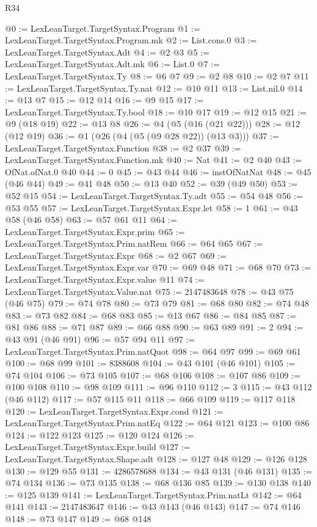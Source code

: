 \begin{lexlean}{R34}
\begin{coremodule}
@0 := LexLeanTarget.TargetSyntax.Program
@1 := LexLeanTarget.TargetSyntax.Program.mk
@2 := List.cons.{0}
@3 := LexLeanTarget.TargetSyntax.Adt
@4 := @2 @3
@5 := LexLeanTarget.TargetSyntax.Adt.mk
@6 := List.{0}
@7 := LexLeanTarget.TargetSyntax.Ty
@8 := @6 @7
@9 := @2 @8
@10 := @2 @7
@11 := LexLeanTarget.TargetSyntax.Ty.nat
@12 := @10 @11
@13 := List.nil.{0}
@14 := @13 @7
@15 := @12 @14
@16 := @9 @15
@17 := LexLeanTarget.TargetSyntax.Ty.bool
@18 := @10 @17
@19 := @12 @15
@21 := @9 (@18 @19)
@22 := @13 @8
@26 := @4 (@5 (@16 (@21 @22)))
@28 := @12 (@12 @19)
@36 := @1 (@26 (@4 (@5 (@9 @28 @22)) (@13 @3)))
@37 := LexLeanTarget.TargetSyntax.Function
@38 := @2 @37
@39 := LexLeanTarget.TargetSyntax.Function.mk
@40 := Nat
@41 := @2 @40
@43 := OfNat.ofNat.{0} @40
@44 := 0
@45 := @43 @44
@46 := instOfNatNat
@48 := @45 (@46 @44)
@49 := @41 @48
@50 := @13 @40
@52 := @39 (@49 @50)
@53 := @52 @15
@54 := LexLeanTarget.TargetSyntax.Ty.adt
@55 := @54 @48
@56 := @53 @55
@57 := LexLeanTarget.TargetSyntax.Expr.let
@58 := 1
@61 := @43 @58 (@46 @58)
@63 := @57 @61 @11
@64 := LexLeanTarget.TargetSyntax.Expr.prim
@65 := LexLeanTarget.TargetSyntax.Prim.natRem
@66 := @64 @65
@67 := LexLeanTarget.TargetSyntax.Expr
@68 := @2 @67
@69 := LexLeanTarget.TargetSyntax.Expr.var
@70 := @69 @48
@71 := @68 @70
@73 := LexLeanTarget.TargetSyntax.Expr.value @11
@74 := LexLeanTarget.TargetSyntax.Value.nat
@75 := 2147483648
@78 := @43 @75 (@46 @75)
@79 := @74 @78
@80 := @73 @79
@81 := @68 @80
@82 := @74 @48
@83 := @73 @82
@84 := @68 @83
@85 := @13 @67
@86 := @84 @85
@87 := @81 @86
@88 := @71 @87
@89 := @66 @88
@90 := @63 @89
@91 := 2
@94 := @43 @91 (@46 @91)
@96 := @57 @94 @11
@97 := LexLeanTarget.TargetSyntax.Prim.natQuot
@98 := @64 @97
@99 := @69 @61
@100 := @68 @99
@101 := 8388608
@104 := @43 @101 (@46 @101)
@105 := @74 @104
@106 := @73 @105
@107 := @68 @106
@108 := @107 @86
@109 := @100 @108
@110 := @98 @109
@111 := @96 @110
@112 := 3
@115 := @43 @112 (@46 @112)
@117 := @57 @115 @11
@118 := @66 @109
@119 := @117 @118
@120 := LexLeanTarget.TargetSyntax.Expr.cond
@121 := LexLeanTarget.TargetSyntax.Prim.natEq
@122 := @64 @121
@123 := @100 @86
@124 := @122 @123
@125 := @120 @124
@126 := LexLeanTarget.TargetSyntax.Expr.build
@127 := LexLeanTarget.TargetSyntax.Shape.adt
@128 := @127 @48
@129 := @126 @128
@130 := @129 @55
@131 := 4286578688
@134 := @43 @131 (@46 @131)
@135 := @74 @134
@136 := @73 @135
@138 := @68 @136 @85
@139 := @130 @138
@140 := @125 @139
@141 := LexLeanTarget.TargetSyntax.Prim.natLt
@142 := @64 @141
@143 := 2147483647
@146 := @43 @143 (@46 @143)
@147 := @74 @146
@148 := @73 @147
@149 := @68 @148

\end{coremodule}
\end{lexlean}
